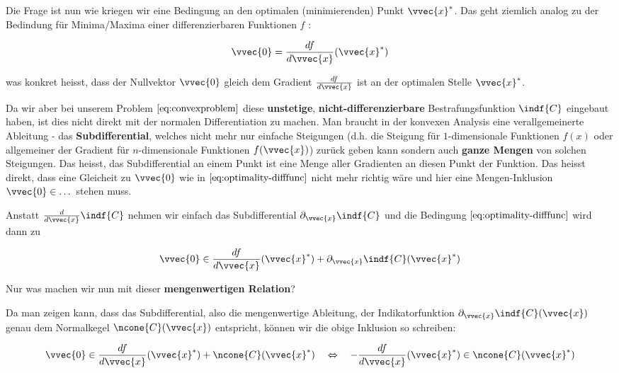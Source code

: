 \documentclass[
  12pt,
  american,
  a4paper,
  twoside,
  titlepage,
  openright,
  numbers=noenddot,
  chapterprefix=true,
  headings=optiontohead,
  svgnames,
  dvipsnames]{scrreprt}
\begin{document}
Die Frage ist nun wie kriegen wir eine Bedingung an den optimalen
(minimierenden) Punkt \(\vvec{x}^*\). Das geht ziemlich analog zu der
Bedindung für Minima/Maxima einer differenzierbaren Funktionen \(f\) :

\begin{align}
\vvec{0} = \frac{df}{d\vvec{x}}(\vvec{x}^*)
\label{eq:optimality-difffunc}
\end{align}

was konkret heisst, dass der Nullvektor \(\vvec{0}\) gleich dem Gradient
\(\frac{df}{d\vvec{x}}\) ist an der optimalen Stelle \(\vvec{x}^*\).

Da wir aber bei unserem Problem \(\eqref{eq:convexproblem}\) diese
\textbf{unstetige}, \textbf{nicht-differenzierbare} Bestrafungsfunktion
\(\indf{C}\) eingebaut haben, ist dies nicht direkt mit der normalen
Differentiation zu machen. Man braucht in der konvexen Analysis eine
verallgemeinerte Ableitung - das \textbf{Subdifferential}, welches nicht
mehr nur einfache Steigungen (d.h. die Steigung für \(1\)-dimensionale
Funktionen \(f(x)\) oder allgemeiner der Gradient für \(n\)-dimensionale
Funktionen \(f(\vvec{x})\)) zurück geben kann sondern auch \textbf{ganze
Mengen} von solchen Steigungen. Das heisst, das Subdifferential an einem
Punkt ist eine Menge aller Gradienten an diesen Punkt der Funktion. Das
heisst direkt, dass eine Gleicheit zu \(\vvec{0}\) wie in
\(\eqref{eq:optimality-difffunc}\) nicht mehr richtig wäre und hier eine
Mengen-Inklusion \(\vvec{0} \in \dots\) stehen muss.

Anstatt \(\frac{d}{d\vvec{x}}\indf{C}\) nehmen wir einfach das
Subdifferential \(\partial_{\vvec{x}} \indf{C}\) und die Bedingung
\(\eqref{eq:optimality-difffunc}\) wird dann zu

\begin{align}
\label{eq:optimality-strict-convex}
\vvec{0} \in \frac{df}{d\vvec{x}}(\vvec{x}^*) + \partial_{\vvec{x}} \indf{C}(\vvec{x}^*)
\end{align}

Nur was machen wir nun mit dieser \textbf{mengenwertigen Relation}?

Da man zeigen kann, dass das Subdifferential, also die mengenwertige
Ableitung, der Indikatorfunktion
\(\partial_{\vvec{x}} \indf{C}(\vvec{x})\) genau dem Normalkegel
\(\ncone{C}(\vvec{x})\) entspricht, können wir die obige Inklusion so
schreiben:

\begin{align}
\vvec{0} \in \frac{df}{d\vvec{x}}(\vvec{x}^*) + \ncone{C}(\vvec{x}^*) \quad \Leftrightarrow \quad -\frac{df}{d\vvec{x}}(\vvec{x}^*) \in \ncone{C}(\vvec{x}^*)
\label{eq:optimality-strict-convex-2}
\end{align}
\end{document}
